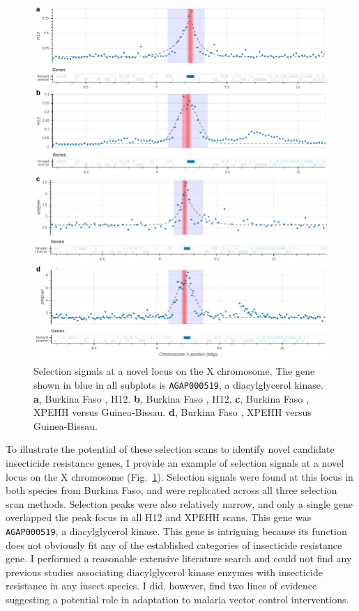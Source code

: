 \documentclass[a4paper,11pt,abstracton,hidelinks]{scrartcl}
\begin{document}
\begin{figure}[t!]
\centering
\includegraphics[width=1\textwidth,center]{artwork/chapter5/dgk.pdf}
\caption{Selection signals at a novel locus on the X chromosome.
%
The gene shown in blue in all subplots is \texttt{AGAP000519}, a diacylglycerol kinase.
%
\textbf{a}, Burkina Faso \acol, H12.
%
\textbf{b}, Burkina Faso \agam, H12.
%
\textbf{c}, Burkina Faso \acol, XPEHH versus Guinea-Bissau.
%
\textbf{d}, Burkina Faso \agam, XPEHH versus Guinea-Bissau.
}
\label{fig:dgk}
\end{figure}


To illustrate the potential of these selection scans to identify novel candidate insecticide resistance genes, I provide an example of selection signals at a novel locus on the X chromosome (Fig.~\ref{fig:dgk}).
%
Selection signals were found at this locus in both species from Burkina Faso, and were replicated across all three selection scan methods.
%
Selection peaks were also relatively narrow, and only a single gene overlapped the peak focus in all H12 and XPEHH scans.
%
This gene was \texttt{AGAP000519}, a diacylglycerol kinase.
%
This gene is intriguing because its function does not obviously fit any of the established categories of insecticide resistance gene.
%
I performed a reasonable extensive literature search and could not find any previous studies associating diacylglycerol kinase enzymes with insecticide resistance in any insect species.
%
I did, however, find two lines of evidence suggesting a potential role in adaptation to malaria vector control interventions.
\end{document}
